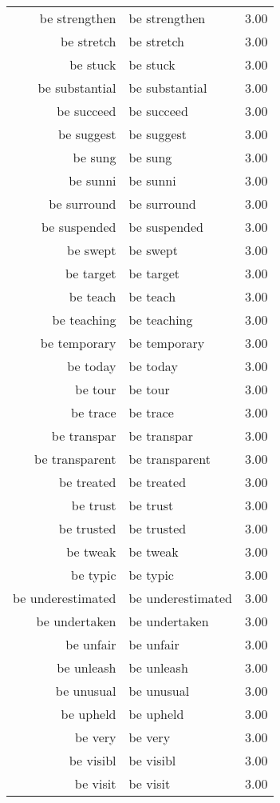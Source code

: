 \begin{table}[ht]
\begin{tabular}{rlr}
  be strengthen & be strengthen & 3.00 \\ 
  be stretch & be stretch & 3.00 \\ 
  be stuck & be stuck & 3.00 \\ 
  be substantial & be substantial & 3.00 \\ 
  be succeed & be succeed & 3.00 \\ 
  be suggest & be suggest & 3.00 \\ 
  be sung & be sung & 3.00 \\ 
  be sunni & be sunni & 3.00 \\ 
  be surround & be surround & 3.00 \\ 
  be suspended & be suspended & 3.00 \\ 
  be swept & be swept & 3.00 \\ 
  be target & be target & 3.00 \\ 
  be teach & be teach & 3.00 \\ 
  be teaching & be teaching & 3.00 \\ 
  be temporary & be temporary & 3.00 \\ 
  be today & be today & 3.00 \\ 
  be tour & be tour & 3.00 \\ 
  be trace & be trace & 3.00 \\ 
  be transpar & be transpar & 3.00 \\ 
  be transparent & be transparent & 3.00 \\ 
  be treated & be treated & 3.00 \\ 
  be trust & be trust & 3.00 \\ 
  be trusted & be trusted & 3.00 \\ 
  be tweak & be tweak & 3.00 \\ 
  be typic & be typic & 3.00 \\ 
  be underestimated & be underestimated & 3.00 \\ 
  be undertaken & be undertaken & 3.00 \\ 
  be unfair & be unfair & 3.00 \\ 
  be unleash & be unleash & 3.00 \\ 
  be unusual & be unusual & 3.00 \\ 
  be upheld & be upheld & 3.00 \\ 
  be very & be very & 3.00 \\ 
  be visibl & be visibl & 3.00 \\ 
  be visit & be visit & 3.00 \\ 

\end{tabular}
\end{table}
